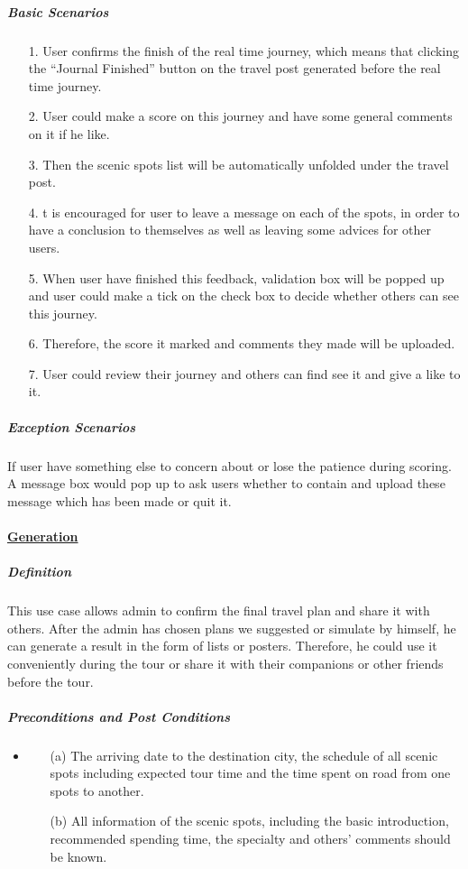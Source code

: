 \documentclass[10pt]{article}
\begin{document}
\begin{itemize}
		\subparagraph{Basic Scenarios}
		\begin{itemize}
			\item[1.] User confirms the finish of the real time journey, which means that clicking the “Journal Finished” button on the travel post generated before the real time journey.
			\item[2.]User could make a score on this journey and have some general comments on it if he like.
			\item[3.]Then the scenic spots list will be automatically unfolded under the travel post.
			\item[4.]t is encouraged for user to leave a message on each of the spots, in order to have a conclusion to themselves as well as leaving some advices for other users.
			\item[5.]When user have finished this feedback, validation box will be popped up and user could make a tick on the check box to decide whether others can see this journey.
			\item[6.]Therefore, the score it marked and comments they made will be uploaded.
			\item[7.]User could review their journey and others can find see it and give a like to it.
			
		 \end{itemize}
		 
		 \subparagraph{Exception Scenarios}
		 If user have something else to concern about or lose the patience during scoring. A message box would pop up to ask users whether to contain and upload these message which has been made or quit it.

		 \paragraph{\underline{Generation}}
		 \subparagraph{Definition}
		 This use case allows admin to confirm the final travel plan and share it with others. After the admin has chosen plans we suggested or simulate by himself, he can generate a result in the form of lists or posters. Therefore, he could use it conveniently during the tour or share it with their companions or other friends before the tour.

		 \subparagraph{Preconditions and Post Conditions}
		 \begin{itemize}
			 \item \begin{itemize}
				 \item[(a)] The arriving date to the destination city, the schedule of all scenic spots including expected tour time and the time spent on road from one spots to another.
				 \item[(b)] All information of the scenic spots, including the basic introduction, recommended spending time, the specialty and others’ comments should be known. 
			 \end{itemize}


\end{itemize}
\end{itemize}
\end{document}
